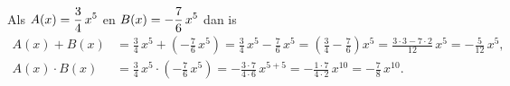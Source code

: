 \documentclass{ximera}
\begin{document}
\begin{example} 
Als $\displaystyle A(x) = \frac{3}{4}\,x^5$ en $\displaystyle B(x) = -\frac{7}{6}\,x^5$ dan is 
\begin{align*}
A(x) + B(x) & = \frac{3}{4}\,x^5 + \left(-\frac{7}{6}\,x^5\right) 
= \frac{3}{4}\,x^5 - \frac{7}{6}\,x^5
= \left(\frac{3}{4} - \frac{7}{6}\right)x^5 
= \frac{3 \cdot 3 - 7 \cdot 2}{12}\,x^5 
= -\frac{5}{12}\,x^5, \\
A(x) \cdot B(x) & = \frac{3}{4}\,x^5 \cdot \left(-\frac{7}{6}\,x^5\right) = - \frac{3 \cdot 7}{4 \cdot 6}\,x^{5+5} = -\frac{1\cdot 7}{4 \cdot 2}\, x^{10} = -\frac{7}{8}\,x^{10}. 
\end{align*}
\end{example}
\end{document}

